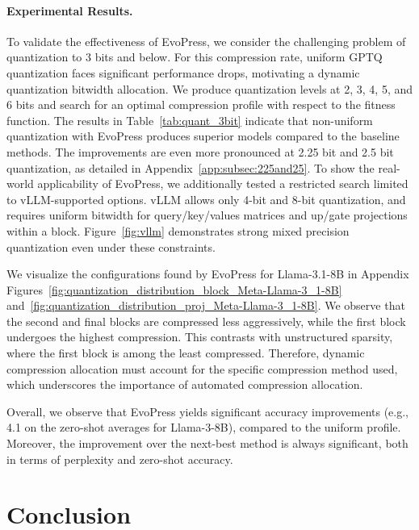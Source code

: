 \documentclass{article}
\theoremstyle{plain}
\theoremstyle{definition}
\theoremstyle{remark}
\newcommand{\methodname}{EvoPress}
\begin{document}
\paragraph{Experimental Results.} 
To validate the effectiveness of \methodname{}, we consider the challenging problem of  quantization to 3 bits and below.
For this compression rate, uniform GPTQ quantization faces significant performance drops, motivating a dynamic quantization bitwidth allocation. We produce quantization levels at 2, 3, 4, 5, and 6 bits and search for an optimal compression profile with respect to the fitness function. The results in Table~\ref{tab:quant_3bit} indicate that non-uniform quantization with \methodname{} produces superior models compared to the baseline methods. The improvements are even more pronounced at 2.25 bit and 2.5 bit quantization, as detailed in Appendix~\ref{app:subsec:225and25}. To show the real-world applicability of \methodname{}, we additionally tested a restricted search limited to vLLM-supported options. vLLM allows only 4-bit and 8-bit quantization, and requires uniform bitwidth for query/key/values matrices and up/gate projections within a block. Figure~\ref{fig:vllm} demonstrates strong mixed precision quantization even under these constraints.




We visualize the configurations found by \methodname{} for Llama-3.1-8B in Appendix Figures~\ref{fig:quantization_distribution_block_Meta-Llama-3_1-8B} and~\ref{fig:quantization_distribution_proj_Meta-Llama-3_1-8B}. We observe that the second and final blocks are compressed less aggressively, while the first block undergoes the highest compression. This contrasts with unstructured sparsity, where the first block is among the least compressed. Therefore, dynamic compression allocation must account for the specific compression method used, which underscores the importance of automated compression allocation.


Overall, we observe that  \methodname{} yields significant accuracy improvements (e.g., 4.1 on the zero-shot averages for Llama-3-8B), compared to the uniform profile. Moreover, the improvement over the next-best method is always significant, both in terms of perplexity and zero-shot accuracy. 





\section{Conclusion}
\label{sec:conclusion}
\end{document}
